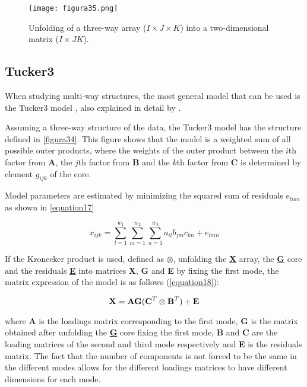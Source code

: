 \begin{figure}[hbtp]
\centering
\texttt{[image: figura35.png]}
\caption[Unfolding of a three-way array into a two-dimensional matrix]{Unfolding of a three-way array ($I \times J \times K$) into a two-dimensional matrix ($I \times JK$).}
\label{figura35}
\end{figure}


\subsection{Tucker3}
When studying multi-way structures, the most general model that can be used is the Tucker3 model \parencite{tucker1966some}, also explained in detail by \textcite{kiers2001three}.

Assuming a three-way structure of the data, the Tucker3 model has the structure defined in \autoref{figura34}. This figure shows that the model is a weighted sum of all possible outer products, where the weights of the outer product between the $i$th factor from \textbf{A}, the $j$th factor from \textbf{B} and the $k$th factor from \textbf{C} is determined by element $g_{ijk}$ of the core. 

Model parameters are estimated by minimizing the squared sum of residuals $e_{lmn}$ as shown in \autoref{equation17}

\begin{equation}
x_{ijk}=\sum\limits_{l=1}^{w_1} \sum\limits_{m=1}^{w_2} \sum\limits_{n=1}^{w_3}a_{il}b_{jm}c_{kn}+e_{lmn}
\label{equation17}
\end{equation}

If the Kronecker product is used, defined as $\otimes$, unfolding the \textbf{\underline{X}} array, the \textbf{\underline{G}} core and the residuals \textbf{\underline{E}} into matrices \textbf{X}, \textbf{G} and \textbf{E} by fixing the first mode, the matrix expression of the model is as follows (\autoref{equation18}):

\begin{equation}
\textbf{\text{X}}=\textbf{\text{AG}}(\textbf{\text{C}}^T\otimes \textbf{\text{B}}^T)+\textbf{\text{E}}
\label{equation18}
\end{equation}

where \textbf{A} is the loadings matrix corresponding to the first mode, \textbf{G} is the matrix obtained after unfolding the \textbf{\underline{G}} core fixing the first mode, \textbf{B} and \textbf{C} are the loading matrices of the second and third mode respectively and \textbf{E} is the residuals matrix. The fact that the number of components is not forced to be the same in the different modes allows for the different loadings matrices to have different dimensions for each mode.

